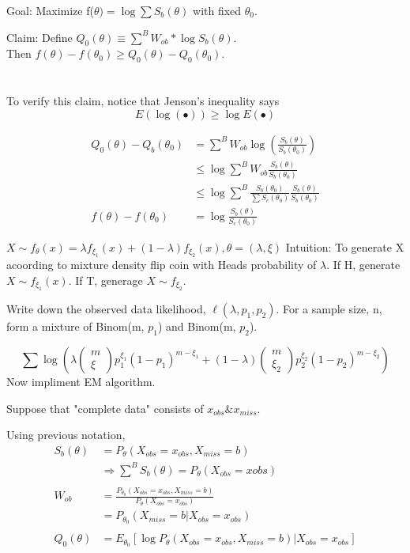 \documentclass[11pt,fleqn]{book} %
\begin{document}
Goal: Maximize f($\theta)=\log \sum S_b(\theta)$ with fixed $\theta_0$.

Claim: Define $Q_0(\theta) \equiv \sum^B W_{ob} * \log S_b(\theta)$. \\
Then $f(\theta) -f(\theta_0) \ge Q_0(\theta) - Q_0(\theta_0)$. \\
\\
\\

To verify this claim, notice that Jenson's inequality says 
$$E(\log(\bullet)) \ge \log E(\bullet) $$

\begin{align*}
	Q_0(\theta)-Q_b(\theta_0)&= \sum^B W_{ob} \log(\frac{S_b(\theta)}{S_b(\theta_0)})\\
		&\le \log \sum^B W_{ob} \frac{S_b(\theta)}{S_b(\theta_0)}\\
		&\le \log \sum^B \frac{S_b(\theta_0)}{\sum S_c(\theta_0)} \frac{S_b(\theta)}{S_b(\theta_0)}\\
	f(\theta) - f(\theta_0) &= \log \frac{S_b(\theta)}{S_c(\theta_0)}	
\end{align*}


\begin{example}
	$X\sim f_\theta(x)=\lambda f_{\xi_1}(x)+(1-\lambda)f_{\xi_2}(x),  \theta=(\lambda, \xi) $
Intuition: To generate X acoording to mixture density flip coin with Heads probability of $\lambda$. If H, generate $X\sim f_{\xi_1}(x)$. If T, generage $X\sim f_{\xi_2} $. 

Write down the observed data likelihood, $\ell(\lambda, p_1, p_2)$. For a sample size, n, form a mixture of Binom(m, $p_1$) and Binom(m, $p_2$). 

$$\sum \log \left(\lambda \left(\begin{matrix} m \\ \xi \end{matrix}\right) p_1^{\xi_1}(1-p_1)^{m-\xi_1}+(1-\lambda)\left(\begin{matrix} m \\ \xi_2 \end{matrix}\right) p_2^{\xi_2}(1-p_2)^{m-\xi_2}\right) $$  
Now impliment EM algorithm.
\end{example}

Suppose that "complete data" consists of $x_{obs} \& x_{miss}$. 

Using previous notation, 
\begin{align*}
	S_b(\theta) &= P_\theta\left(X_{obs}=x_{obs}, X_{miss}=b \right)\\
	&\Rightarrow \sum^B S_b(\theta) = P_\theta\left(X_{obs}=x{obs} \right) \\
	\\
	W_{ob}&= \frac{P_{\theta_0}\left(X_{obs}=x_{obs}, X_{miss}=b \right)}{P_\theta\left(X_{obs}=x_{obs}\right)}\\ 
		&= P_{\theta_0}\left(X_{miss}=b|X_{obs}=x_{obs}\right)\\
		\\
	Q_0(\theta)&= E_{\theta_0}[\log P_\theta\left(X_{obs}=x_{obs}, X_{miss}=b\right)|X_{obs}=x_{obs}]	
\end{align*}
\end{document}
